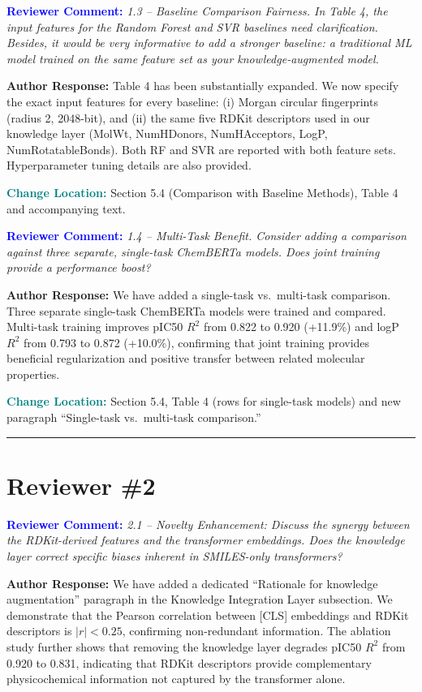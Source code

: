 \documentclass[12pt]{article}
\newcommand{\RC}[1]{\textbf{\textcolor{blue}{Reviewer Comment:}} \textit{#1}\vspace{0.3em}}
\newcommand{\AR}[1]{\textbf{Author Response:} #1\vspace{0.8em}}
\newcommand{\CH}[1]{\textbf{\textcolor{teal}{Change Location:}} #1\vspace{0.5em}}
\begin{document}
\bigskip

\RC{1.3 -- Baseline Comparison Fairness. In Table 4, the input features for the Random Forest and SVR baselines need clarification. Besides, it would be very informative to add a stronger baseline: a traditional ML model trained on the same feature set as your knowledge-augmented model.}

\AR{Table 4 has been substantially expanded. We now specify the exact input features for every baseline: (i) Morgan circular fingerprints (radius 2, 2048-bit), and (ii) the same five RDKit descriptors used in our knowledge layer (MolWt, NumHDonors, NumHAcceptors, LogP, NumRotatableBonds). Both RF and SVR are reported with both feature sets. Hyperparameter tuning details are also provided.}

\CH{Section 5.4 (Comparison with Baseline Methods), Table 4 and accompanying text.}

\bigskip

\RC{1.4 -- Multi-Task Benefit. Consider adding a comparison against three separate, single-task ChemBERTa models. Does joint training provide a performance boost?}

\AR{We have added a single-task vs.\ multi-task comparison. Three separate single-task ChemBERTa models were trained and compared. Multi-task training improves pIC50 $R^2$ from 0.822 to 0.920 (+11.9\%) and logP $R^2$ from 0.793 to 0.872 (+10.0\%), confirming that joint training provides beneficial regularization and positive transfer between related molecular properties.}

\CH{Section 5.4, Table 4 (rows for single-task models) and new paragraph ``Single-task vs.\ multi-task comparison.''}

\bigskip
\hrule
\bigskip

\section*{Reviewer \#2}

\RC{2.1 -- Novelty Enhancement: Discuss the synergy between the RDKit-derived features and the transformer embeddings. Does the knowledge layer correct specific biases inherent in SMILES-only transformers?}

\AR{We have added a dedicated ``Rationale for knowledge augmentation'' paragraph in the Knowledge Integration Layer subsection. We demonstrate that the Pearson correlation between [CLS] embeddings and RDKit descriptors is $|r| < 0.25$, confirming non-redundant information. The ablation study further shows that removing the knowledge layer degrades pIC50 $R^2$ from 0.920 to 0.831, indicating that RDKit descriptors provide complementary physicochemical information not captured by the transformer alone.}
\end{document}
